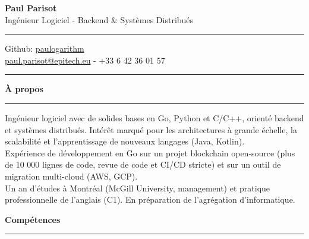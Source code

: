 \documentclass[9pt]{extarticle}
\begin{document}
\begin{center}
	{\huge\bfseries Paul Parisot}
	\\[9pt]
	{\Large Ingénieur Logiciel - Backend \& Systèmes Distribués}
	\\
\end{center}

\par\vspace{-5pt}
\rule{\linewidth}{0.4pt}
\par\vspace{-5pt}

\begin{center}
	Github: \href{https://github.com/paulogarithm}{paulogarithm}
	\\
	\href{mailto:paul.parisot@epitech.eu}{paul.parisot@epitech.eu} - +33 6 42 36 01 57
	\\
\end{center}

\par\vspace{-10pt}
\rule{\linewidth}{0.4pt}
\par\vspace{7pt}

{\large\bfseries À propos}
\par\vspace{-8pt}
\rule{\linewidth}{0.4pt}
\par\vspace{5pt}

Ingénieur logiciel avec de solides bases en Go, Python et C/C++, orienté backend et systèmes distribués. Intérêt marqué pour les architectures à grande échelle, la scalabilité et l'apprentissage de nouveaux langages (Java, Kotlin).
\\
Expérience de développement en Go sur un projet blockchain open-source (plus de 10 000 lignes de code, revue de code et CI/CD stricte) et sur un outil de migration multi-cloud (AWS, GCP).
\\
Un an d'études à Montréal (McGill University, management) et pratique professionnelle de l'anglais (C1). En préparation de l'agrégation d'informatique.
\par\vspace{5pt}

{\large\bfseries Compétences}
\par\vspace{-8pt}
\rule{\linewidth}{0.4pt}
\par\vspace{5pt}
\end{document}
